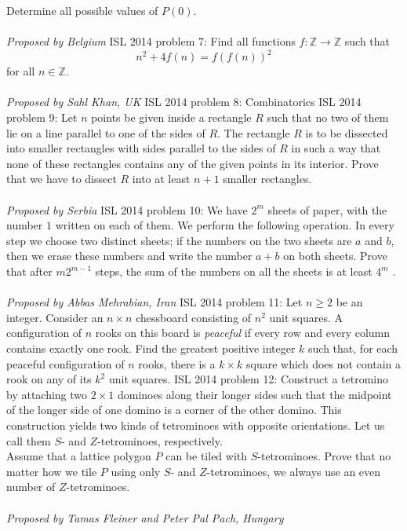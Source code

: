 Determine all possible values of $P(0)$. \\\\
\textit{Proposed by Belgium} 
ISL 2014 problem 7:  Find all functions $f : \mathbb{Z} \to\mathbb{ Z}$ such that
\[ n^2+4f(n)=f(f(n))^2 \]
for all $n\in \mathbb{Z}$. \\\\
\textit{Proposed by Sahl Khan, UK} 
ISL 2014 problem 8:  Combinatorics 
ISL 2014 problem 9:  Let $n$ points be given inside a rectangle $R$ such that no two of them lie on a line parallel to one of the sides of $R$. The rectangle $R$ is to be dissected into smaller rectangles with sides parallel to the sides of $R$ in such a way that none of these rectangles contains any of the given points in its interior. Prove that we have to dissect $R$ into at least $n + 1$ smaller rectangles. \\\\
\textit{Proposed by Serbia} 
ISL 2014 problem 10:  We have $2^m$ sheets of paper, with the number $1$ written on each of them. We perform the following operation. In every step we choose two distinct sheets; if the numbers on the two sheets are $a$ and $b$, then we erase these numbers and write the number $a + b$ on both sheets. Prove that after $m2^{m -1}$ steps, the sum of the numbers on all the sheets is at least $4^m$ . \\\\
\textit{Proposed by Abbas Mehrabian, Iran} 
ISL 2014 problem 11:  Let $n \ge 2$ be an integer. Consider an $n \times n$ chessboard consisting of $n^2$ unit squares. A configuration of $n$ rooks on this board is \textit{peaceful} if every row and every column contains exactly one rook. Find the greatest positive integer $k$ such that, for each peaceful configuration of $n$ rooks, there is a $k \times k$ square which does not contain a rook on any of its $k^2$ unit squares. 
ISL 2014 problem 12:  Construct a tetromino by attaching two $2 \times 1$ dominoes along their longer sides such that the midpoint of the longer side of one domino is a corner of the other domino. This construction yields two kinds of tetrominoes with opposite orientations. Let us call them $S$- and $Z$-tetrominoes, respectively. \\
Assume that a lattice polygon $P$ can be tiled with $S$-tetrominoes. Prove that no matter how we tile $P$ using only $S$- and $Z$-tetrominoes, we always use an even number of $Z$-tetrominoes. \\\\
\textit{Proposed by Tamas Fleiner and Peter Pal Pach, Hungary} 
